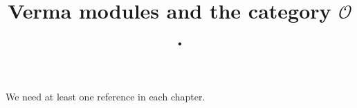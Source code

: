 

%


\title{Verma modules and the category $\mathcal O$.}


\maketitle

\label{section-phantom}


\tableofcontents

We need at least one reference \cite{reference} in each chapter.













